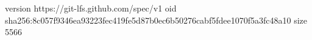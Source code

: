 version https://git-lfs.github.com/spec/v1
oid sha256:8c057f9346ea93223fec419fe5d87b0ec6b50276cabf5fdee1070f5a3fc48a10
size 5566
